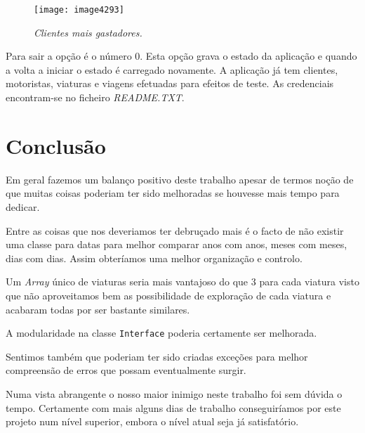 \documentclass[a4paper,12pt]{report}
\begin{document}
\begin{figure}[h]
	\centering
	\texttt{[image: image4293]}
	\caption{\small\sl Clientes mais gastadores.}
	\captionsetup[figure]{list=yes}
\end{figure}

Para sair a opção é o número 0. Esta opção grava o estado da aplicação e quando a volta a iniciar o estado é carregado novamente. A aplicação já tem clientes, motoristas, viaturas e viagens efetuadas para efeitos de teste. As credenciais encontram-se no ficheiro {\sl README.TXT}.

\chapter {Conclusão}

Em geral fazemos um balanço positivo deste trabalho apesar de termos noção de que muitas coisas poderiam ter sido melhoradas se houvesse mais tempo para dedicar.

Entre as coisas que nos deveriamos ter debruçado mais é o facto de não existir uma classe para datas para melhor comparar anos com anos, meses com meses, dias com dias. Assim obteríamos uma melhor organização e controlo.

Um {\sl Array} único de viaturas seria mais vantajoso do que 3 para cada viatura visto que não aproveitamos bem as possibilidade de exploração de cada viatura e acabaram todas por ser bastante similares.

A modularidade na classe {\tt Interface} poderia certamente ser melhorada.

Sentimos também que poderiam ter sido criadas exceções para melhor compreensão de erros que possam eventualmente surgir.

Numa vista abrangente o nosso maior inimigo neste trabalho foi sem dúvida o tempo. Certamente com mais alguns dias de trabalho conseguiríamos por este projeto num nível superior, embora o nível atual seja já satisfatório.
\end{document}
